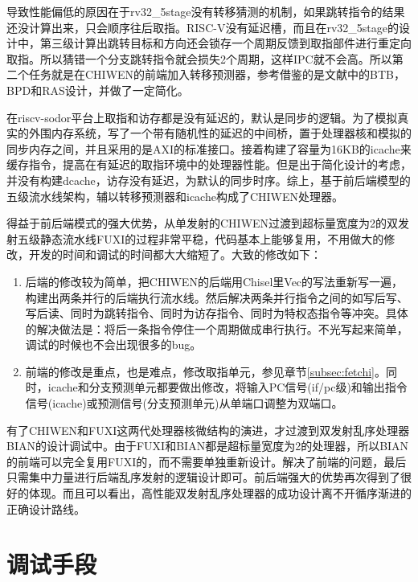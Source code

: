 导致性能偏低的原因在于rv32\_5stage没有转移猜测的机制，如果跳转指令的结果还没计算出来，只会顺序往后取指。RISC-V没有延迟槽，而且在rv32\_5stage的设计中，第三级计算出跳转目标和方向还会锁存一个周期反馈到取指部件进行重定向取指。所以猜错一个分支跳转指令就会损失2个周期，这样IPC就不会高。所以第二个任务就是在CHIWEN的前端加入转移预测器，参考借鉴的是文献\citet{Celio:EECS-2017-157}中的BTB，BPD和RAS设计，并做了一定简化。

在riscv-sodor平台上取指和访存都是没有延迟的，默认是同步的逻辑。为了模拟真实的外围内存系统，写了一个带有随机性的延迟的中间桥，置于处理器核和模拟的同步内存之间，并且采用的是AXI的标准接口。接着构建了容量为16KB的icache来缓存指令，提高在有延迟的取指环境中的处理器性能。但是出于简化设计的考虑，并没有构建dcache，访存没有延迟，为默认的同步时序。综上，基于前后端模型的五级流水线架构，辅以转移预测器和icache构成了CHIWEN处理器。

得益于前后端模式的强大优势，从单发射的CHIWEN过渡到超标量宽度为2的双发射五级静态流水线FUXI的过程非常平稳，代码基本上能够复用，不用做大的修改，开发的时间和调试的时间都大大缩短了。大致的修改如下：
\begin{enumerate}[label=(\alph*)]
	\item 后端的修改较为简单，把CHIWEN的后端用Chisel里Vec的写法重新写一遍，构建出两条并行的后端执行流水线。然后解决两条并行指令之间的如写后写、写后读、同时为跳转指令、同时为访存指令、同时为特权态指令等冲突。具体的解决做法是：将后一条指令停住一个周期做成串行执行。不光写起来简单，调试的时候也不会出现很多的bug。
	\item 前端的修改是重点，也是难点，修改取指单元，参见章节\ref{subsec:fetchi}。同时，icache和分支预测单元都要做出修改，将输入PC信号(if/pc级)和输出指令信号(icache)或预测信号(分支预测单元)从单端口调整为双端口。
\end{enumerate}

有了CHIWEN和FUXI这两代处理器核微结构的演进，才过渡到双发射乱序处理器BIAN的设计调试中。由于FUXI和BIAN都是超标量宽度为2的处理器，所以BIAN的前端可以完全复用FUXI的，而不需要单独重新设计。解决了前端的问题，最后只需集中力量进行后端乱序发射的逻辑设计即可。前后端强大的优势再次得到了很好的体现。而且可以看出，高性能双发射乱序处理器的成功设计离不开循序渐进的正确设计路线。

\section{调试手段}

